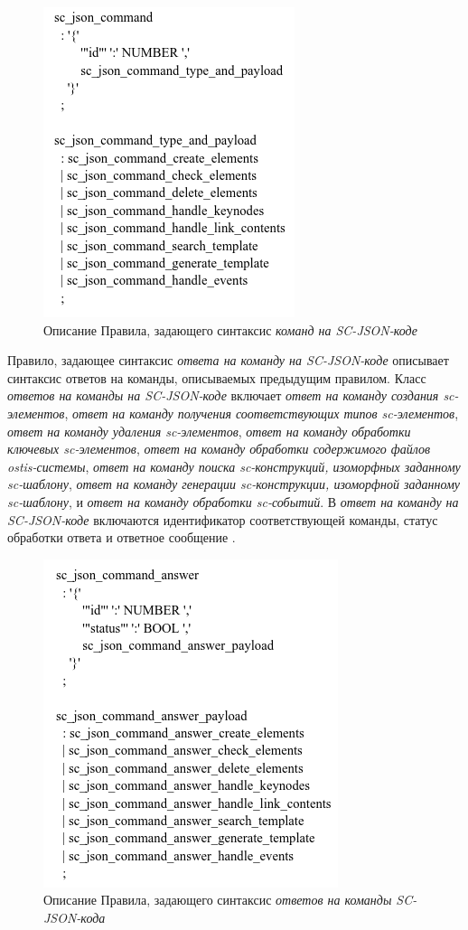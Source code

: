 \begin{figure}[htbp]
  \center
  \includegraphics[scale=0.9]{author/part6/figures/command.png}
  \caption{Описание Правила, задающего синтаксис \textit{команд на SC-JSON-коде}}
  \label{fig:command}
\end{figure}

Правило, задающее синтаксис \textit{ответа на команду на SC-JSON-коде} описывает синтаксис ответов на команды, описываемых предыдущим правилом. Класс \textit{ответов на команды на SC-JSON-коде} включает \textit{ответ на команду создания sc-элементов}, \textit{ответ на команду получения соответствующих типов sc-элементов}, \textit{ответ на команду удаления sc-элементов}, \textit{ответ на команду обработки ключевых sc-элементов}, \textit{ответ на команду обработки содержимого файлов ostis-системы}, \textit{ответ на команду поиска sc-конструкций, изоморфных заданному sc-шаблону}, \textit{ответ на команду генерации sc-конструкции, изоморфной заданному sc-шаблону}, и \textit{ответ на команду обработки sc-событий}. В \textit{ответ на команду на SC-JSON-коде} включаются идентификатор соответствующей команды, статус обработки ответа и ответное сообщение .

\begin{figure}[htbp]
  \center
  \includegraphics[scale=0.8]{author/part6/figures/command_answer.png}
  \caption{Описание Правила, задающего синтаксис \textit{ответов на команды SC-JSON-кода}}
  \label{fig:command_answer}
\end{figure}

